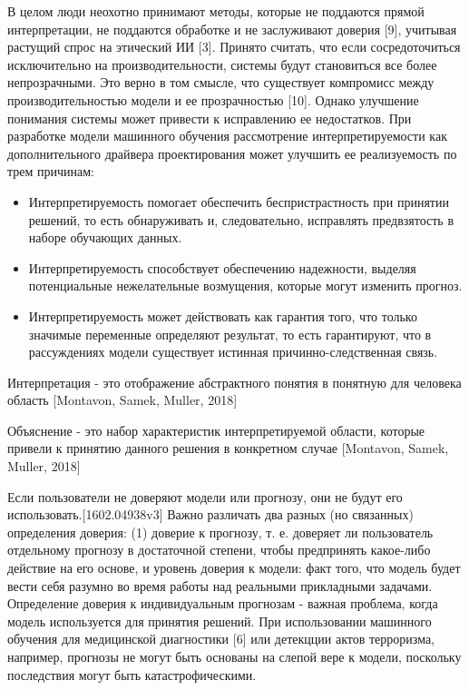 \documentclass[oneside,final,14pt]{extreport}
\begin{document}
В целом люди неохотно принимают методы, которые не поддаются прямой интерпретации, не поддаются обработке и не заслуживают доверия [9], учитывая растущий спрос на этический ИИ [3]. Принято считать, что если сосредоточиться исключительно на производительности, системы будут становиться все более непрозрачными. Это верно в том смысле, что существует компромисс между производительностью модели и ее прозрачностью [10]. Однако улучшение понимания системы может привести к исправлению ее недостатков. При разработке модели машинного обучения рассмотрение интерпретируемости как дополнительного драйвера проектирования может улучшить ее реализуемость по трем причинам:
\begin{itemize}
\item Интерпретируемость помогает обеспечить беспристрастность при принятии решений, то есть обнаруживать и, следовательно, исправлять предвзятость в наборе обучающих данных.
\item Интерпретируемость способствует обеспечению надежности, выделяя потенциальные нежелательные возмущения, которые могут изменить прогноз.
\item Интерпретируемость может действовать как гарантия того, что только значимые переменные определяют результат, то есть гарантируют, что в рассуждениях модели существует истинная причинно-следственная связь.
\end{itemize}

Интерпретация - это отображение абстрактного понятия в понятную для человека область [Montavon, Samek, Muller, 2018]

Объяснение - это набор характеристик интерпретируемой области, которые привели к принятию данного решения в конкретном случае [Montavon, Samek, Muller, 2018]

Если пользователи не доверяют модели или прогнозу,
они не будут его использовать.[1602.04938v3] Важно различать два разных (но связанных) определения доверия: (1) доверие к прогнозу, т. е. доверяет ли пользователь отдельному прогнозу в достаточной степени, чтобы предпринять какое-либо действие на его основе, и уровень доверия к модели: факт того, что модель будет вести себя разумно во время работы над реальными прикладными задачами. Определение доверия к индивидуальным прогнозам - важная проблема, когда модель используется для принятия решений. При использовании машинного обучения для медицинской диагностики [6] или детекцции актов терроризма, например, прогнозы не могут быть основаны на слепой вере к модели, поскольку последствия могут быть катастрофическими.
\end{document}
